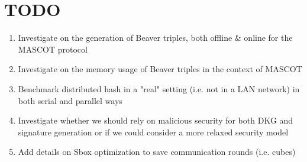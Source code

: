 \section{TODO}

\begin{enumerate}
	\item Investigate on the generation of Beaver triples, both offline \& online for the MASCOT protocol
	\item Investigate on the memory usage of Beaver triples in the context of MASCOT
	\item Benchmark distributed hash in a "real" setting (i.e. not in a LAN network) in both serial and parallel ways
	\item Investigate whether we should rely on malicious security for both DKG and signature generation or if we could consider a more relaxed security model
	\item Add details on Sbox optimization to save communication rounds (i.e. cubes)
\end{enumerate}